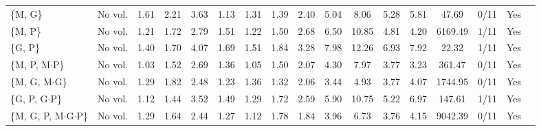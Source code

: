 \begin{tabular}{@{}llccccccccccccccc@{}}
\{M, G\} & No vol. & 1.61 & 2.21 & 3.63 & 1.13 & 1.31 & 1.39 & 2.40 & 5.04 & 8.06 & 5.28 & 5.81 & 47.69 & 0/11 & Yes \\
\{M, P\} & No vol. & 1.21 & 1.72 & 2.79 & 1.51 & 1.22 & 1.50 & 2.68 & 6.50 & 10.85 & 4.81 & 4.20 & 6169.49 & 1/11 & Yes \\
\{G, P\} & No vol. & 1.40 & 1.70 & 4.07 & 1.69 & 1.51 & 1.84 & 3.28 & 7.98 & 12.26 & 6.93 & 7.92 & 22.32 & 1/11 & Yes \\
\{M, P, M$\cdot$P\} & No vol. & 1.03 & 1.52 & 2.69 & 1.36 & 1.05 & 1.50 & 2.07 & 4.30 & 7.97 & 3.77 & 3.23 & 361.47 & 0/11 & Yes \\
\{M, G, M$\cdot$G\} & No vol. & 1.29 & 1.82 & 2.48 & 1.23 & 1.36 & 1.32 & 2.06 & 3.44 & 4.93 & 3.77 & 4.07 & 1744.95 & 0/11 & Yes \\
\{G, P, G$\cdot$P\} & No vol. & 1.12 & 1.44 & 3.52 & 1.49 & 1.29 & 1.72 & 2.59 & 5.90 & 10.75 & 5.22 & 6.97 & 147.61 & 1/11 & Yes \\
\{M, G, P, M$\cdot$G$\cdot$P\} & No vol. & 1.29 & 1.64 & 2.44 & 1.27 & 1.12 & 1.78 & 1.84 & 3.96 & 6.73 & 3.76 & 4.15 & 9042.39 & 0/11 & Yes \\
\bottomrule
\end{tabular}
